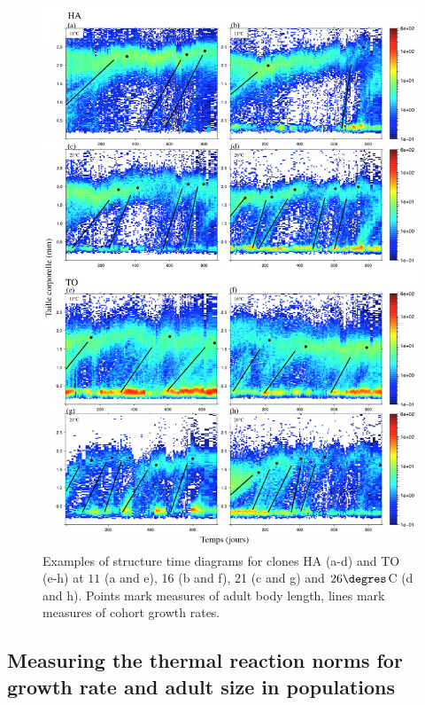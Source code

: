 \begin{figure}[H]
\begin{center}
\includegraphics[width=\textwidth]{1_CorpsDeThese/Resumes/Fig/FIP02}
\caption[Examples of
structure time diagrams]{Examples of
structure time diagrams for clones
HA (a-d) and TO (e-h) at $11$ (a and e), 16 (b and f), 21 (c and g) and
$26\degres$C (d and h). Points mark measures of adult body length, lines mark
measures of cohort growth rates.}
\label{fig:AnFIP2}
\end{center}
\end{figure}

\subsection{Measuring the thermal reaction norms for growth rate and adult size
in populations}

